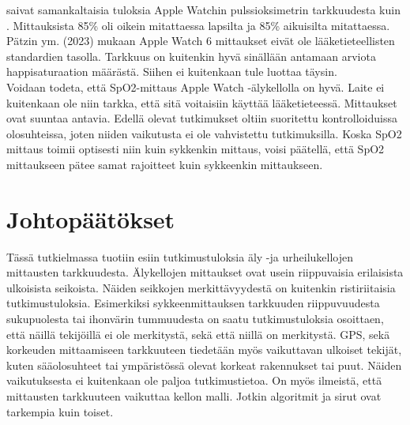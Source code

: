 \documentclass[utf8,bachelor,finnish]{bachelor}
\begin{document}
  \textcite{patz_accuracy_2023} saivat samankaltaisia tuloksia Apple Watchin pulssioksimetrin tarkkuudesta kuin \textcite{pipek_comparison_2021}. Mittauksista 85\%
   oli oikein mitattaessa lapsilta ja 85\% aikuisilta mitattaessa. Pätzin ym. (2023) mukaan Apple Watch 6 mittaukset eivät ole
    lääketieteellisten standardien tasolla. Tarkkuus on kuitenkin hyvä sinällään antamaan arviota happisaturaation määrästä.
     Siihen ei kuitenkaan tule luottaa täysin.\\

    Voidaan todeta, että SpO2-mittaus Apple Watch -älykellolla on hyvä. Laite ei kuitenkaan ole niin tarkka, että sitä voitaisiin käyttää
     lääketieteessä. Mittaukset ovat suuntaa antavia. Edellä olevat tutkimukset oltiin suoritettu kontrolloiduissa olosuhteissa, joten niiden vaikutusta ei ole vahvistettu tutkimuksilla.
      Koska SpO2 mittaus toimii optisesti niin kuin sykkenkin mittaus, voisi päätellä, että SpO2 mittaukseen pätee samat rajoitteet kuin sykkeenkin mittaukseen. \\

      
    
  
  
\chapter{Johtopäätökset}

Tässä tutkielmassa tuotiin esiin tutkimustuloksia äly -ja urheilukellojen mittausten tarkkuudesta.
 Älykellojen mittaukset ovat usein riippuvaisia erilaisista ulkoisista seikoista. Näiden seikkojen merkittävyydestä on kuitenkin ristiriitaisia tutkimustuloksia.
  Esimerkiksi sykkeenmittauksen tarkkuuden riippuvuudesta sukupuolesta tai ihonvärin tummuudesta on saatu tutkimustuloksia
   osoittaen, että näillä tekijöillä ei ole merkitystä, sekä että niillä on merkitystä. GPS, sekä korkeuden mittaamiseen tarkkuuteen tiedetään myös vaikuttavan
    ulkoiset tekijät, kuten sääolosuhteet tai ympäristössä olevat korkeat rakennukset tai puut. Näiden vaikutuksesta ei kuitenkaan ole paljoa tutkimustietoa.
     On myös ilmeistä, että mittausten tarkkuuteen vaikuttaa kellon malli. Jotkin algoritmit ja sirut ovat tarkempia kuin toiset.\\
\end{document}
